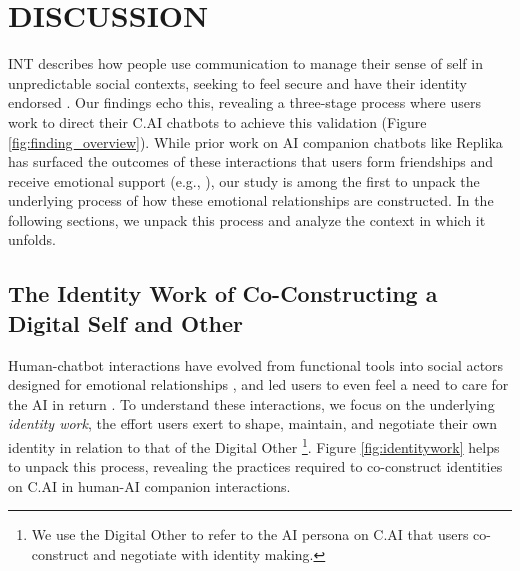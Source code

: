 \documentclass[sigconf, nonacm]{acmart}
\begin{document}
\section{DISCUSSION}
INT describes how people use communication to manage their sense of self in unpredictable social contexts, seeking to feel secure and have their identity endorsed \cite{ting2017identity}. Our findings echo this, revealing a three-stage process where users work to direct their C.AI chatbots to achieve this validation (Figure \ref{fig:finding_overview}). While prior work on AI companion chatbots like Replika has surfaced the outcomes of these interactions that users form friendships and receive emotional support (e.g., \cite{brandtzaeg2022my, ta2020user}), our study is among the first to unpack the underlying process of how these emotional relationships are constructed. In the following sections, we unpack this process and analyze the context in which it unfolds.

\subsection{The Identity Work of Co-Constructing a Digital Self and Other}
Human-chatbot interactions have evolved from functional tools \cite{chan2023students} into social actors designed for emotional relationships \cite{Lomas2023ReplikaSafety, ho2018psychological, ta2020user}, and led users to even feel a need to care for the AI in return \cite{brandtzaeg2022my}. To understand these interactions, we focus on the underlying \textit{identity work}, the effort users exert to shape, maintain, and negotiate their own identity \cite{snow2000clarifying, snow1987identity} in relation to that of the Digital Other \footnote{We use the Digital Other to refer to the AI persona on C.AI that users co-construct and negotiate with identity making.}. Figure \ref{fig:identitywork} helps to unpack this process, revealing the practices required to co-construct identities on C.AI in human-AI companion interactions.
\end{document}
